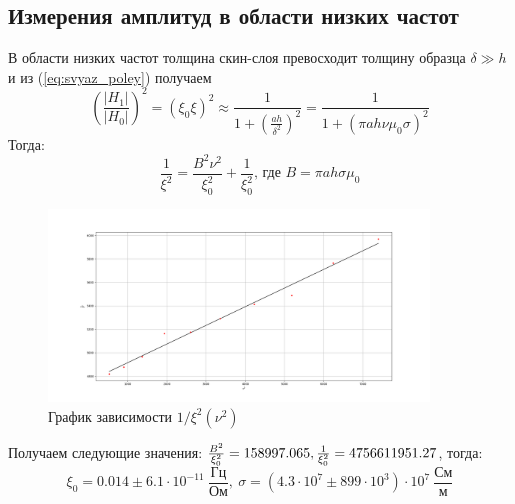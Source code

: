 \documentclass[a4paper, 12pt]{article}
\begin{document}
	\subsection*{Измерения амплитуд в области низких частот}
	В области низких частот толщина скин-слоя превосходит толщину образца $ \delta \gg h$  и из (\ref{eq:svyaz_poley}) получаем
	\begin{equation*}
		\left(\frac{|H_1|}{|H_0|}\right)^2 = (\xi_0\xi)^2 \approx \frac{1}{1+\left(\frac{ah}{\delta^2}\right)^2} = \frac{1}{1 + \left(\pi ah\nu\mu_0\sigma\right)^2}
	\end{equation*}
	Тогда: 
	\begin{equation*}
		\frac{1}{\xi^2}=\frac{B^2\nu^2}{\xi_0^2} + \frac{1}{\xi_0^2} \text{, где } B=\pi a h \sigma \mu_0
		\label{eq:liniya_dlya_c}
	\end{equation*}
	\begin{figure}[h!]
		\centering
		\includegraphics[width=0.9\textwidth, height = 0.45\textheight]{skin.png}
		\caption{График зависимости $1/\xi^2(\nu^2)$}\label{fig:xi_nu_low_freq_linearized}
	\end{figure}
	Получаем следующие значения: $\\\frac{B^2}{\xi_0^2} = 158997.065, \ \\\frac{1}{\xi_0^2} = 4756611951.27$, тогда:
	\[\xi_0 = 0.014 \pm 6.1\cdot 10^{-11} \ \frac{\text{Гц}}{\text{Ом}}, \ \sigma = (4.3 \cdot 10^{7} \pm 899 \cdot 10^{3}) \cdot 10^7 \ \frac{\text{См}}{\text{м}}  \]
	
\end{document}
